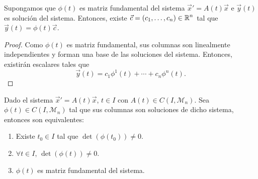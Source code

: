 \begin{prop}
Supongamos que $\displaystyle \phi\left(t\right) $ es matriz fundamental del sistema $\displaystyle \vec{x}' = A\left(t\right)\vec{x} $ e $\displaystyle \vec{y}\left(t\right) $ es solución del sistema. Entonces, existe $\displaystyle \vec{c}= \left(c_{1}, \ldots, c_{n}\right)\in \mathbb{R}^{n} $ tal que $\displaystyle \vec{y}\left(t\right)=\phi\left(t\right)\vec{c} $. 
\end{prop}
\begin{proof}
Como $\displaystyle \phi\left(t\right) $ es matriz fundamental, sus columnas son linealmente independientes y forman una base de las soluciones del sistema. Entonces, existirán escalares tales que 
\[\vec{y}\left(t\right)=c_{1}\phi^{1}\left(t\right) + \cdots + c_{n}\phi^{n}\left(t\right) .\]
\end{proof}
\begin{prop}
Dado el sistema $\displaystyle \vec{x}' = A\left(t\right)\vec{x} $, $\displaystyle t \in I $ con $\displaystyle A\left(t\right)\in C\left(I, \mathcal{M}_{n}\right) $. Sea $\displaystyle \phi\left(t\right)\in C\left(I, \mathcal{M}_{n}\right) $ tal que sus columnas son soluciones de dicho sistema, entonces son equivalentes:
\begin{enumerate}
\item Existe $\displaystyle t_{0} \in I $ tal que $\displaystyle \det\left(\phi\left(t_{0}\right)\right)\neq 0 $. 
\item $\displaystyle \forall t \in I $, $\displaystyle \det\left(\phi\left(t\right)\right) \neq 0 $. 
\item $\displaystyle \phi\left(t\right) $ es matriz fundamental del sistema. 
\end{enumerate}
\end{prop}
